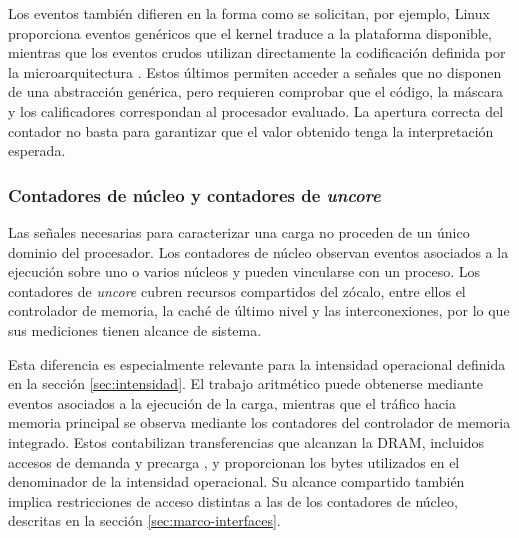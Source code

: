 Los eventos también difieren en la forma como se solicitan, por ejemplo, Linux proporciona
eventos genéricos que el kernel traduce a la plataforma disponible, mientras
que los eventos crudos utilizan directamente la codificación definida por la
microarquitectura \cite{Weaver2015,IntelSDM2026}. Estos últimos permiten acceder
a señales que no disponen de una abstracción genérica, pero requieren comprobar
que el código, la máscara y los calificadores correspondan al procesador
evaluado. La apertura correcta del contador no basta para garantizar que el
valor obtenido tenga la interpretación esperada.

\subsubsection{Contadores de núcleo y contadores de \textit{uncore}}
\label{sec:uncore}

Las señales necesarias para caracterizar una carga no proceden de un único
dominio del procesador. Los contadores de núcleo observan eventos asociados a
la ejecución sobre uno o varios núcleos y pueden vincularse con un proceso. Los
contadores de \textit{uncore} cubren recursos compartidos del zócalo, entre
ellos el controlador de memoria, la caché de último nivel y las
interconexiones, por lo que sus mediciones tienen alcance de sistema.

Esta diferencia es especialmente relevante para la intensidad operacional
definida en la sección \ref{sec:intensidad}. El trabajo aritmético puede
obtenerse mediante eventos asociados a la ejecución de la carga, mientras que
el tráfico hacia memoria principal se observa mediante los contadores del
controlador de memoria integrado. Estos contabilizan transferencias que
alcanzan la DRAM, incluidos accesos de demanda y precarga
\cite{IntelUncore2021}, y proporcionan los bytes utilizados en el denominador
de la intensidad operacional. Su alcance compartido también implica
restricciones de acceso distintas a las de los contadores de núcleo, descritas
en la sección \ref{sec:marco-interfaces}.


